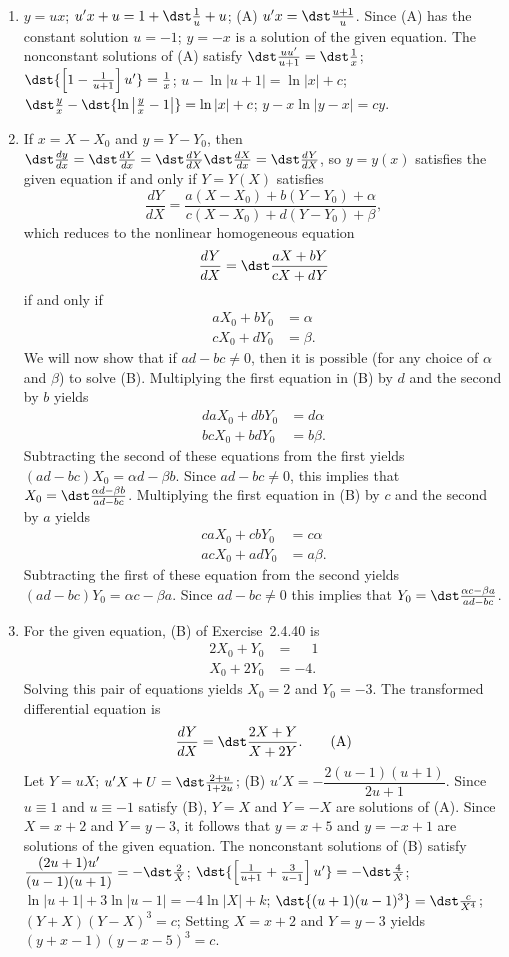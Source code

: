 \documentclass[openany]{book}
\newenvironment{sectionSolutions}{
 \begin{enumerate}[item-label={\thesection.\arabic{enumi}.}]
}{
 \end{enumerate}
}
\begin{document}
\begin{sectionSolutions}
\item
$y=ux$;\;
$u'x+u=1+\dst\frac{1}{ u}+u$;\;
(A) $u'x=\dst\frac{u+1}{ u}$.
Since (A)  has the constant solution $u=-1$;
$y=-x$ is
a solution of the given equation. The nonconstant solutions of (A)
satisfy
$\dst\frac{uu'}{ u+1}=\dst\frac{1}{ x}$;\;
$\dst{\left[1-\frac{1 }{ u+1}\right]u'}=\frac{1}{ x}$;\;
$u-\ln |u+1|=\ln |x|+c$;\;
$\dst\frac{y}{ x}-\dst{\ln\left|\frac{y}{ x}-1\right|}=\ln|x|+c$;\;
$y-x\ln|y-x|=cy$.

\item
If $x=X-X_0$ and $y=Y-Y_0$, then $\dst\frac{dy}{ dx}=\dst\frac{dY}{
dx}=\dst\frac{dY}{ dX}\dst\frac{dX}{ dx}=\dst\frac{dY}{ dX}$, so $y=y(x)$
satisfies the given equation if and only if $Y=Y(X)$ satisfies
\[
\frac{dY}{ dX}=\dfrac{a(X-X_0)+b(Y-Y_0)+\alpha}{
c(X-X_0)+d(Y-Y_0)+\beta},
\]
 which reduces to the nonlinear homogeneous equation
\[
\frac{dY}{ dX}=\dst\frac{aX+bY}{ cX+dY}
\]
 if and only if
\[
\begin{aligned}
aX_0+bY_0&=\alpha\\
cX_0+dY_0&=\beta.
\end{aligned}
\tag{B}
\]
We will now show that
if $ad-bc\ne0$, then it is possible (for any choice of $\alpha$
and $\beta$) to solve (B).
Multiplying the first equation in (B) by $d$ and
 the second by  $b$ yields
\begin{align*}
daX_0+dbY_0&=d\alpha  \\
bcX_0+bdY_0&=b\beta.
\end{align*}
Subtracting the second of these equations from the first yields
 $(ad-bc)X_0=\alpha d-\beta b$.
Since $ad-bc\ne0$, this implies that $X_0=\dst\frac{\alpha d-\beta b}{
ad-bc}$. Multiplying the first equation in (B) by
$c$ and the second by $a$ yields
\begin{align*}
caX_0+cbY_0&=c\alpha  \\
acX_0+adY_0&=a\beta.
\end{align*}
Subtracting the first of these equation from the second yields
 $(ad-bc)Y_0=\alpha c-\beta a$. Since $ad-bc\ne0$ this implies that
$Y_0=\dst\frac{\alpha c-\beta a}{ ad-bc}$.


\item
For the given equation, (B)
of Exercise~2.4.40 is
\begin{align*}
2X_0+Y_0&=\phantom{-}1\\
X_0+2Y_0&=-4.
\end{align*}
Solving this pair of equations yields   $X_0=2$ and $Y_0=-3$.
The transformed differential equation is
\[
\frac{dY}{ dX}=\dst\frac{2X+Y}{ X+2Y}.
\tag{A}
\]
Let $Y=uX$;\;
$u'X+U=\dst\frac{2+u}{1+2u}$;\;
(B) $u'X=-\dfrac{2(u-1)(u+1)}{ 2u+1}$. Since $u\equiv1$ and
$u\equiv-1$
satisfy (B), $Y=X$ and $Y=-X$ are solutions of (A).
 Since $X=x+2$ and $Y=y-3$, it follows that $y=x+5$
and $y=-x+1$ are solutions of the given equation. The nonconstant
solutions of (B) satisfy
$\dfrac{(2u+1)u'}{(u-1)(u+1)}=-\dst\frac{2}{ X}$;\;
$\dst{\left[\frac{1}{ u+1}+\frac{3}{ u-1}\right]u'}=-\dst\frac{4}{
X}$;\;
$\ln|u+1|+3\ln|u-1|=-4\ln|X|+k$;\;
$\dst{(u+1)(u-1)^3}=\dst\frac{c}{ X^4}$;\;
$(Y+X)(Y-X)^3=c$;\;
Setting $X=x+2$ and $Y=y-3$ yields
$(y+x-1)(y-x-5)^3=c$.



\end{sectionSolutions}
\end{document}
